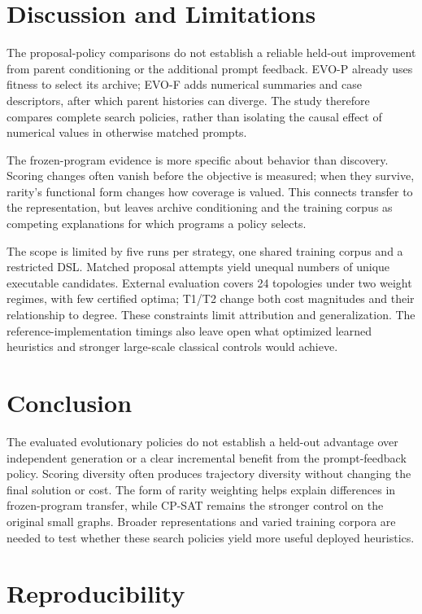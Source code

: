 \section{Discussion and Limitations}

The proposal-policy comparisons do not establish a reliable held-out
improvement from parent conditioning or the additional prompt feedback.
EVO-P already uses fitness to select its archive; EVO-F adds numerical
summaries and case descriptors, after which parent histories can diverge.
The study therefore compares complete search policies, rather than
isolating the causal effect of numerical values in otherwise matched
prompts.

The frozen-program evidence is more specific about behavior than
discovery. Scoring changes often vanish before the objective is
measured; when they survive, rarity's functional form changes how
coverage is valued. This connects transfer to the representation,
but leaves archive conditioning and the training corpus as competing
explanations for which programs a policy selects.

The scope is limited by five runs per strategy, one shared training
corpus and a restricted DSL. Matched proposal attempts yield unequal
numbers of unique executable candidates. External evaluation covers
24 topologies under two weight regimes, with few certified optima;
T1/T2 change both cost magnitudes and their relationship to degree.
These constraints limit attribution and generalization. The
reference-implementation timings also leave open what optimized learned
heuristics and stronger large-scale classical controls would achieve.

\section{Conclusion}

The evaluated evolutionary policies do not establish a held-out advantage
over independent generation or a clear incremental benefit from the
prompt-feedback policy. Scoring diversity often produces trajectory
diversity without changing the final solution or cost. The form of
rarity weighting helps explain differences in frozen-program transfer,
while CP-SAT remains the stronger control on the original small graphs.
Broader representations and varied training corpora are needed to test
whether these search policies yield more useful deployed heuristics.

\section{Reproducibility}

